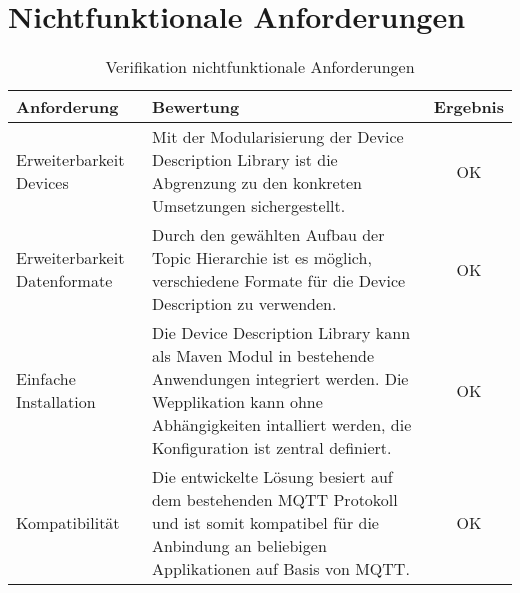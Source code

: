 \section{Nichtfunktionale Anforderungen}

\begin{table}[H]
\begin{tabularx}{\textwidth}{|l|X|c|}

 \hline \rowcolor{lightgray}
 {\bf Anforderung } & {\bf Bewertung } & {\bf Ergebnis} \\  \hline
 
 Erweiterbarkeit Devices & Mit der Modularisierung der Device Description Library ist die Abgrenzung zu den konkreten Umsetzungen sichergestellt. & OK \\ \hline

 Erweiterbarkeit Datenformate   & Durch den gewählten Aufbau der Topic Hierarchie ist es möglich, verschiedene Formate für die Device Description zu verwenden. & OK \\ \hline

 Einfache Installation    & Die Device Description Library kann als Maven Modul in bestehende Anwendungen integriert werden. Die Wepplikation kann ohne Abhängigkeiten intalliert werden, die Konfiguration ist zentral definiert. & OK \\ \hline

 Kompatibilität     & Die entwickelte Lösung besiert auf dem bestehenden MQTT Protokoll und ist somit kompatibel für die Anbindung an beliebigen Applikationen auf Basis von MQTT. & OK \\ \hline


\end{tabularx}
\caption{Verifikation nichtfunktionale Anforderungen}
\end{table}
